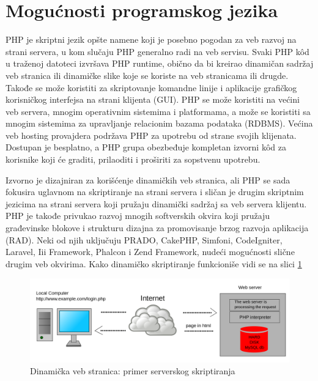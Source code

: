 \documentclass[a4paper]{article}
\begin{document}
{\section{Mogućnosti programskog jezika}
PHP je skriptni jezik opšte namene koji je posebno pogodan za veb razvoj na strani servera, u kom slučaju PHP generalno radi na veb servisu. Svaki PHP k\^{o}d u traženoj datoteci izvršava PHP runtime\cite{php}, obično da bi kreirao dinamičan sadržaj veb stranica ili dinamičke slike koje se koriste na veb stranicama ili drugde. Takođe se može koristiti za skriptovanje komandne linije i aplikacije grafičkog korisničkog interfejsa na strani klijenta (GUI). PHP se može koristiti na većini veb servera, mnogim operativnim sistemima i platformama, a može se koristiti sa mnogim sistemima za upravljanje relacionim bazama podataka (RDBMS). Većina veb hosting provajdera podržava PHP za upotrebu od strane svojih klijenata. Dostupan je besplatno, a PHP grupa obezbeđuje kompletan izvorni k\^{o}d za korisnike koji će graditi, prilaoditi i proširiti za sopstvenu upotrebu.

Izvorno je dizajniran za korišćenje dinamičkih veb stranica, ali PHP se sada fokusira uglavnom na skriptiranje na strani servera i sličan je drugim skriptnim jezicima na strani servera koji pružaju dinamički sadržaj sa veb servera klijentu. PHP je takođe privukao razvoj mnogih softverskih okvira koji pružaju građevinske blokove i strukturu dizajna za promovisanje brzog razvoja aplikacija (RAD). Neki od njih uključuju PRADO, CakePHP, Simfoni, CodeIgniter, Laravel, Iii Framework, Phalcon i Zend Framework, nudeći mogućnosti slične drugim veb okvirima\cite{PHPtheGoodParts}. Kako dinamičko skriptiranje funkcioniše vidi se na slici \ref{fig:server}


\begin{figure}[h!]
\begin{center}
\includegraphics[scale=0.15]{primer_serverskog_skriptiranja.png}
\end{center}
\caption{Dinamička veb stranica: primer serverskog skriptiranja}
\label{fig:server}
\end{figure}

}
\end{document}

